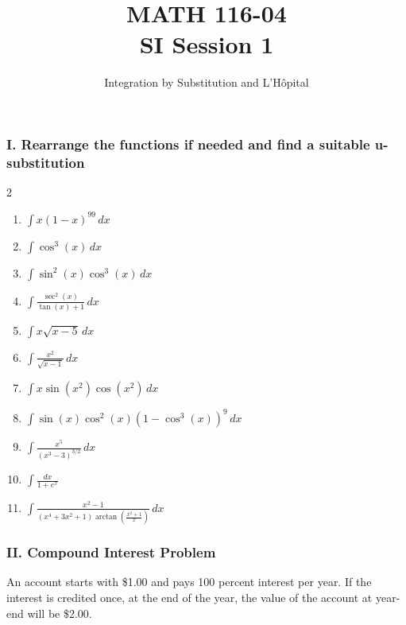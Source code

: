 \documentclass[12pt]{article}
\begin{document}

\title{MATH 116-04 \\ SI Session 1}
\author{Integration by Substitution and L'Hôpital}

\maketitle

\subsubsection*{I. Rearrange the functions if needed and find a suitable u-substitution }

\begin{multicols}{2}
\begin{enumerate}
    \item $\displaystyle \int x(1-x)^{99} \, dx$
    \item $\displaystyle \int \cos^3(x) \, dx$
    \item $\displaystyle \int \sin^2(x)\cos^3(x) \, dx$
    \item $\displaystyle \int \frac{\sec^2(x)}{\tan(x)+1} \, dx$
    \item $\displaystyle \int x\sqrt{x-5} \, dx$
    \item $\displaystyle \int \frac{x^2}{\sqrt{x-1}} \, dx$
    \item $\displaystyle \int x\sin(x^2)\cos(x^2) \, dx$
    \item $\displaystyle \int \sin(x)\cos^2(x)(1-\cos^3(x))^{9} \, dx$
    \item $\displaystyle \int \frac{x^5}{(x^3-3)^{3/2}} \, dx$
    \item $\displaystyle \int \frac{dx}{1+e^x}$
    \item $\displaystyle \int \frac{x^2-1}{(x^4+3x^2+1)\arctan\left(\frac{x^2+1}{x}\right)} \, dx$

\end{enumerate}
\end{multicols}



\subsubsection*{II. Compound Interest Problem}

An account starts with \$1.00 and pays 100 percent interest per year. If the interest is credited once, at the end of the year, the value of the account at year-end will be \$2.00. 
\end{document}
